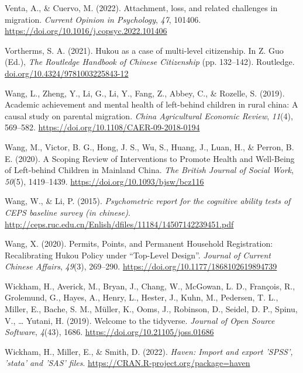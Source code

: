 \documentclass[
  man,floatsintext]{apa7}
\newlength{\cslhangindent}
\newlength{\cslentryspacingunit} %
\newenvironment{CSLReferences}[2] %
 {%
  \setlength{\parindent}{0pt}
  \ifodd #1
  \let\oldpar\par
  \def\par{\hangindent=\cslhangindent\oldpar}
  \fi
  \setlength{\parskip}{#2\cslentryspacingunit}
 }%
 {}
\begin{document}
\begin{CSLReferences}{1}{0}
\leavevmode{}%
Venta, A., \& Cuervo, M. (2022). Attachment, loss, and related challenges in migration. \emph{Current Opinion in Psychology}, \emph{47}, 101406. \url{https://doi.org/10.1016/j.copsyc.2022.101406}

\leavevmode{}%
Vortherms, S. A. (2021). Hukou as a case of multi-level citizenship. In Z. Guo (Ed.), \emph{The Routledge Handbook of Chinese Citizenship} (pp. 132--142). Routledge. \href{https://doi.org/10.4324/9781003225843-12}{doi.org/10.4324/9781003225843-12}

\leavevmode{}%
Wang, L., Zheng, Y., Li, G., Li, Y., Fang, Z., Abbey, C., \& Rozelle, S. (2019). Academic achievement and mental health of left-behind children in rural china: A causal study on parental migration. \emph{China Agricultural Economic Review}, \emph{11}(4), 569--582. \url{https://doi.org/10.1108/CAER-09-2018-0194}

\leavevmode{}%
Wang, M., Victor, B. G., Hong, J. S., Wu, S., Huang, J., Luan, H., \& Perron, B. E. (2020). A Scoping Review of Interventions to Promote Health and Well-Being of Left-behind Children in Mainland China. \emph{The British Journal of Social Work}, \emph{50}(5), 1419--1439. \url{https://doi.org/10.1093/bjsw/bcz116}

\leavevmode{}%
Wang, W., \& Li, P. (2015). \emph{Psychometric report for the cognitive ability tests of CEPS baseline survey (in chinese)}. \url{http://ceps.ruc.edu.cn/Enlish/dfiles/11184/14507142239451.pdf}

\leavevmode{}%
Wang, X. (2020). Permits, Points, and Permanent Household Registration: Recalibrating Hukou Policy under {``}Top-Level Design{''}. \emph{Journal of Current Chinese Affairs}, \emph{49}(3), 269--290. \url{https://doi.org/10.1177/1868102619894739}

\leavevmode{}%
Wickham, H., Averick, M., Bryan, J., Chang, W., McGowan, L. D., François, R., Grolemund, G., Hayes, A., Henry, L., Hester, J., Kuhn, M., Pedersen, T. L., Miller, E., Bache, S. M., Müller, K., Ooms, J., Robinson, D., Seidel, D. P., Spinu, V., \ldots{} Yutani, H. (2019). Welcome to the {tidyverse}. \emph{Journal of Open Source Software}, \emph{4}(43), 1686. \url{https://doi.org/10.21105/joss.01686}

\leavevmode{}%
Wickham, H., Miller, E., \& Smith, D. (2022). \emph{Haven: Import and export 'SPSS', 'stata' and 'SAS' files}. \url{https://CRAN.R-project.org/package=haven}


\end{CSLReferences}
\end{document}
